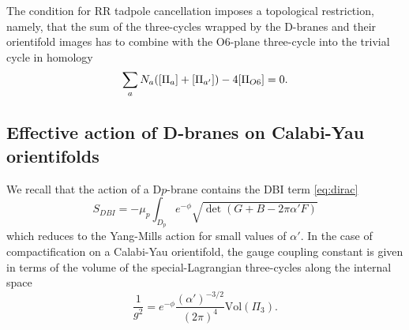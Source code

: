 The condition for RR tadpole cancellation imposes a topological restriction, namely, 
that the sum of the three-cycles wrapped by the D-branes and their orientifold images
has to combine with the O$6$-plane three-cycle into the trivial cycle in homology
\begin{equation}
  \sum_a N_a \qty([\Pi_a] + [\Pi_{a'}]) - 4 [\Pi_{O6}]=0.
\end{equation}

\subsection{Effective action of D-branes on Calabi-Yau orientifolds}


We recall that the action of a D$p$-brane contains the DBI term \eqref{eq:dirac}
\begin{equation}
  S_{DBI} = -\mu_p \int_{D_p} e^{-\phi}\sqrt{\det (G+B-2\pi \alpha' F)}
\end{equation}
which reduces to the Yang-Mills action for small values of $\alpha'$.
In the case of compactification on a Calabi-Yau orientifold, the gauge coupling  constant is given
in terms of the volume of the special-Lagrangian three-cycles along the internal space
\begin{equation}
  \frac{1}{g^2}=e^{-\phi}\frac{(\alpha')^{-3/2}}{(2\pi)^{4}}\mathrm{Vol}(\Pi_{3}).
\end{equation}

%

